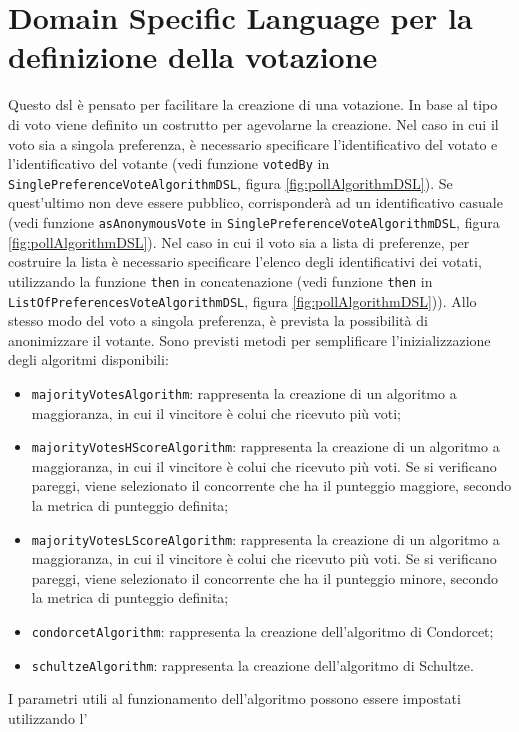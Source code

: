 \documentclass[12pt,a4paper,openright,twoside]{book}
\begin{document}
 \section{Domain Specific Language per la definizione della votazione}
 Questo \ac{dsl} è pensato per facilitare la creazione di una votazione.
 In base al tipo di voto viene definito un costrutto per agevolarne la creazione.
 Nel caso in cui il voto sia a singola preferenza, è necessario specificare
 l'identificativo del votato e l'identificativo del votante (vedi funzione \texttt{votedBy} in \texttt{SinglePreferenceVoteAlgorithmDSL}, figura \ref{fig:pollAlgorithmDSL}). Se quest'ultimo non 
 deve essere pubblico, corrisponderà ad un identificativo casuale (vedi funzione \texttt{asAnonymousVote} in \texttt{SinglePreferenceVoteAlgorithmDSL}, figura \ref{fig:pollAlgorithmDSL}).
 Nel caso in cui il voto sia a lista di preferenze, per costruire la lista è necessario specificare l'elenco degli identificativi dei votati,
 utilizzando la funzione \texttt{then} in concatenazione (vedi funzione \texttt{then} in \texttt{ListOfPreferencesVoteAlgorithmDSL}, figura \ref{fig:pollAlgorithmDSL})).
 Allo stesso modo del voto a singola preferenza, è prevista la possibilità di anonimizzare il votante.
 Sono previsti metodi per semplificare l'inizializzazione degli algoritmi disponibili:
 \begin{itemize}
    \item{\texttt{majorityVotesAlgorithm}: rappresenta la creazione di un algoritmo a maggioranza, in cui il vincitore è colui che ricevuto più voti;}
    \item{\texttt{majorityVotesHScoreAlgorithm}: rappresenta la creazione di un algoritmo a maggioranza, in cui il vincitore è colui che ricevuto più voti.
    Se si verificano pareggi, viene selezionato il concorrente che ha il punteggio maggiore, secondo la metrica di punteggio definita;}
    \item{\texttt{majorityVotesLScoreAlgorithm}: rappresenta la creazione di un algoritmo a maggioranza, in cui il vincitore è colui che ricevuto più voti.
    Se si verificano pareggi, viene selezionato il concorrente che ha il punteggio minore, secondo la metrica di punteggio definita;}
    \item{\texttt{condorcetAlgorithm}: rappresenta la creazione dell'algoritmo di Condorcet;}
    \item{\texttt{schultzeAlgorithm}: rappresenta la creazione dell'algoritmo di Schultze.}
 \end{itemize}
I parametri utili al funzionamento dell'algoritmo possono essere impostati utilizzando l'
\end{document}
